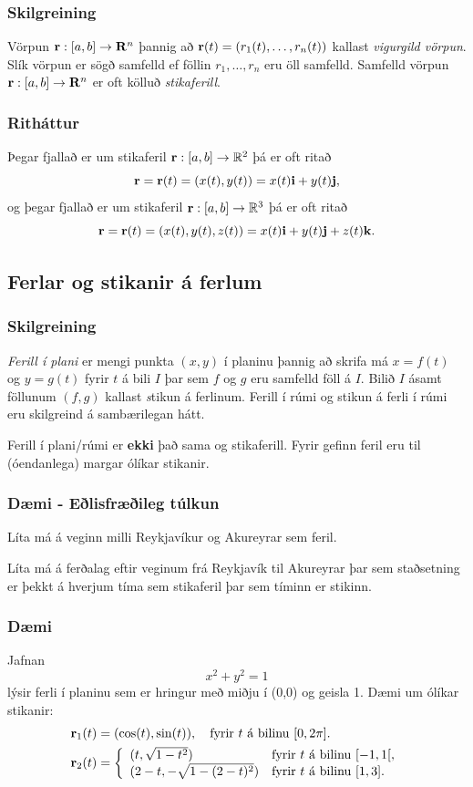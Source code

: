 \subsubsection{Skilgreining }
Vörpun $\mbox{${\bf r}$}:  [a,b]\rightarrow \mbox{${\bf R}^n$}$ þannig að $\mbox{${\bf r}$}(t)=(r_1(t),\ldots,r_n(t))$ kallast {\em vigurgild vörpun}.  Slík vörpun er sögð samfelld ef föllin $r_1, \ldots, r_n$ eru öll samfelld.  Samfelld vörpun $\mbox{${\bf r}$}:  [a,b]\rightarrow \mbox{${\bf R}^n$}$ er oft kölluð {\em stikaferill}.



\subsubsection{Ritháttur }
 Þegar fjallað er um stikaferil $\mbox{${\bf r}$}:  [a,b]\rightarrow {\mathbb R}^2$ þá er oft ritað
$$\mbox{${\bf r}$}=\mbox{${\bf r}$}(t)=(x(t),y(t))=x(t)\mbox{${\bf i}$}+y(t)\mbox{${\bf j}$},$$
og þegar fjallað er um stikaferil $\mbox{${\bf r}$}:  [a,b]\rightarrow {\mathbb R}^3$ þá er oft ritað
$$\mbox{${\bf r}$}=\mbox{${\bf r}$}(t)=(x(t),y(t),z(t))=x(t)\mbox{${\bf i}$}+y(t)\mbox{${\bf j}$}+z(t)\mbox{${\bf k}$}.$$



\subsection{Ferlar og stikanir á ferlum}
\subsubsection{Skilgreining }
{\em Ferill í plani} er mengi punkta $(x,y)$ í planinu þannig að skrifa má $x=f(t)$ og $y=g(t)$ fyrir $t$ á bili $I$ þar sem $f$ og $g$ eru samfelld föll á $I$. Bilið $I$ ásamt föllunum $(f,g)$ kallast {\emph stikun} á ferlinum. Ferill í rúmi og stikun á ferli í rúmi eru skilgreind á sambærilegan hátt.


Ferill í plani/rúmi er \textbf{ekki} það sama og stikaferill. Fyrir gefinn feril eru til (óendanlega) margar ólíkar stikanir.
\pause
\subsubsection{Dæmi - Eðlisfræðileg túlkun}
Líta má á veginn milli Reykjavíkur og Akureyrar sem feril.

Líta má á ferðalag eftir veginum frá Reykjavík til Akureyrar þar sem staðsetning er þekkt á hverjum tíma sem stikaferil þar sem tíminn er stikinn.

\pause
\subsubsection{Dæmi }
Jafnan
$$x^2+y^2 = 1$$
lýsir ferli í planinu sem er hringur með miðju í (0,0) og geisla 1. Dæmi um ólíkar stikanir:
\begin{align*}
\mbox{${\bf r}$}_1(t) &= (\cos(t),\sin(t)), \quad \text{fyrir $t$ á bilinu $[0,2\pi].$} \\
\mbox{${\bf r}$}_2(t) &= \left\{\begin{array}{ll}
(t,\sqrt{1-t^2}) & \text{fyrir $t$ á bilinu $[-1,1[,$} \\
(2-t,-\sqrt{1-(2-t)^2}) & \text{fyrir $t$ á bilinu $[1,3].$} 
\end{array}\right.
\end{align*}






